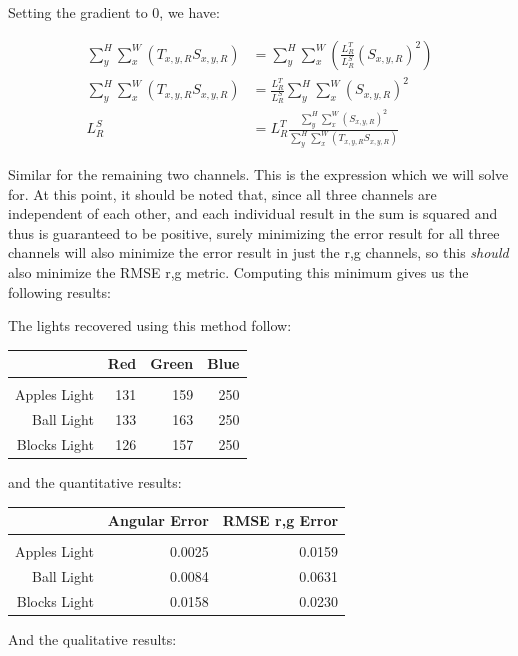 \documentclass{article}
\begin{document}
Setting the gradient to 0, we have:

\begin{align*}
\sum^H_y \sum^W_x (T_{x,y,R} S_{x,y,R}) &= \sum^H_y \sum^W_x (\frac{L^T_R}{L^S_R} (S_{x,y,R})^2) \\
\sum^H_y \sum^W_x (T_{x,y,R} S_{x,y,R}) &= \frac{L^T_R}{L^S_R} \sum^H_y \sum^W_x (S_{x,y,R})^2 \\
L^S_R &= L^T_R \frac{\sum^H_y \sum^W_x (S_{x,y,R})^2}{\sum^H_y \sum^W_x (T_{x,y,R} S_{x,y,R})}
\end{align*}

Similar for the remaining two channels. This is the expression which we will 
solve for. At this point, it should be noted that, since all three channels are 
independent of each other, and each individual result in the sum is squared and 
thus is guaranteed to be positive, surely minimizing the error result for all three 
channels will also minimize the error result in just the r,g channels, so this 
\textit{should} also minimize the RMSE r,g metric. Computing this minimum gives 
us the following results:

The lights recovered using this method follow:

\begin{tabular}{r | r r r}
                 & Red & Green & Blue \\
    \hline                            \\
    Apples Light & 131 &   159 &  250 \\
      Ball Light & 133 &   163 &  250 \\
    Blocks Light & 126 &   157 &  250
\end{tabular}

and the quantitative results:

\begin{tabular}{r | r r}
                 & Angular Error & RMSE r,g Error \\
    \hline                                        \\
    Apples Light &        0.0025 &         0.0159 \\
      Ball Light &        0.0084 &         0.0631 \\
    Blocks Light &        0.0158 &         0.0230
\end{tabular}

And the qualitative results:
\end{document}
